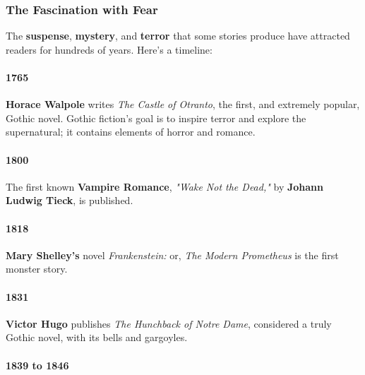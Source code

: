 
\subsubsection{The Fascination with Fear}
\label{sub_sub_sec:the_fascination_with_fear}

The \textbf{suspense}, \textbf{mystery}, and \textbf{terror} that some stories
produce have attracted readers for hundreds of years.
Here's a timeline:

\paragraph{1765}
\label{par:1765}

\textbf{Horace Walpole} writes \textit{The Castle of Otranto}, the first, and
extremely popular, Gothic novel. Gothic fiction's goal is to inspire terror and
explore the supernatural; it contains elements of horror and romance.


\paragraph{1800}
\label{par:1800}

The first known \textbf{Vampire Romance}, \textit{"Wake Not the Dead,"} by
\textbf{Johann Ludwig Tieck}, is published.


\paragraph{1818}
\label{par:1818}

\textbf{Mary Shelley's} novel \textit{Frankenstein:} or, \textit{The Modern
Prometheus} is the first monster story.


\paragraph{1831}
\label{par:1831}

\textbf{Victor Hugo} publishes \textit{The Hunchback of Notre Dame}, considered
a truly Gothic novel, with its bells and gargoyles.


\paragraph{1839 to 1846}
\label{par:1839_to_1846}

